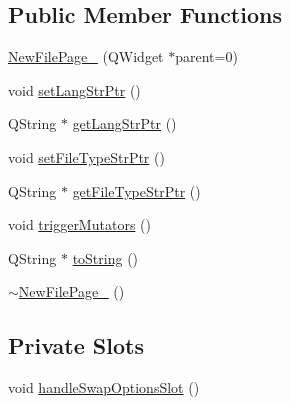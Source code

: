 \subsection*{Public Member Functions}
\begin{DoxyCompactItemize}
\item 
\hyperlink{class_new_file_page__1_ad79384836bb84e907b49d4bf6ccbebaf}{New\-File\-Page\-\_} (Q\-Widget $\ast$parent=0)
\item 
void \hyperlink{class_new_file_page__1_aedb155a9cc29ed45603544e7de9f0179}{set\-Lang\-Str\-Ptr} ()
\item 
Q\-String $\ast$ \hyperlink{class_new_file_page__1_aaf195fbe5a34973ed0e65f4cafc276f4}{get\-Lang\-Str\-Ptr} ()
\item 
void \hyperlink{class_new_file_page__1_a3823895d19c55de9b7865299f1d85a25}{set\-File\-Type\-Str\-Ptr} ()
\item 
Q\-String $\ast$ \hyperlink{class_new_file_page__1_a3113674205e78514901da898e4d6f748}{get\-File\-Type\-Str\-Ptr} ()
\item 
void \hyperlink{class_new_file_page__1_a670bb1f3c278c7c27cd7747d2e3906cc}{trigger\-Mutators} ()
\item 
Q\-String $\ast$ \hyperlink{class_new_file_page__1_a568799ae8fd3fcbf4217c2d2af250fdd}{to\-String} ()
\item 
\hyperlink{class_new_file_page__1_a3179b495b36c69da575e95e05fd59264}{$\sim$\-New\-File\-Page\-\_} ()
\end{DoxyCompactItemize}
\subsection*{Private Slots}
\begin{DoxyCompactItemize}
\item 
void \hyperlink{class_new_file_page__1_a8fc47da92a246e9fed5b2e335a5a2b9a}{handle\-Swap\-Options\-Slot} ()
\end{DoxyCompactItemize}
